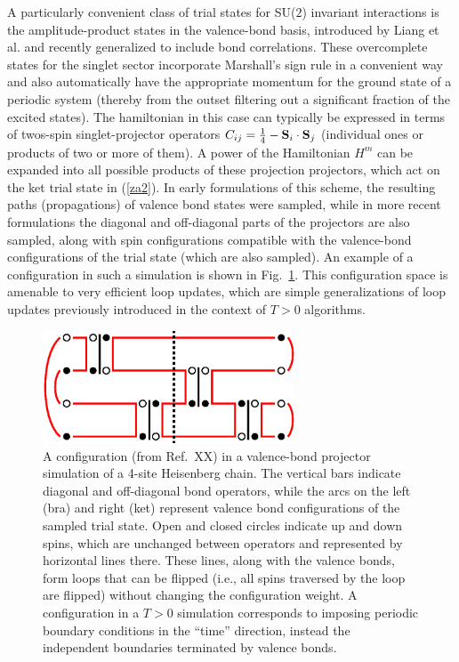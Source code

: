 \documentclass[aps,prb,groupedaddress,twocolumn]{revtex4}
\begin{document}
A particularly convenient class of trial states for SU($2$) invariant interactions is the amplitude-product states in the valence-bond basis, 
introduced by Liang et al. and recently generalized to include bond correlations. These overcomplete states for the singlet sector incorporate
Marshall's sign rule in a convenient way and also automatically have the appropriate momentum for the ground state of a periodic system (thereby
from the outset filtering out a significant fraction of the excited states). The hamiltonian in this case can typically be expressed in terms of 
twos-spin singlet-projector operators $C_{ij}=\frac{1}{4}-{\bf S}_i\cdot {\bf S}_j$ (individual ones or products of two or more of them). A power 
of the Hamiltonian $H^m$ can be expanded into all possible products of these projection projectors, which act on the ket trial state in (\ref{za2}). 
In early formulations of this scheme, the resulting paths (propagations) of valence bond states were sampled, while in more recent formulations the 
diagonal and off-diagonal parts of the projectors are also sampled, along with spin configurations compatible with the valence-bond configurations 
of the trial state (which are also sampled). An example of a configuration in such a simulation is shown in Fig.~\ref{loops}. This configuration
space is amenable to very efficient loop updates, which are simple generalizations of loop updates previously introduced in the context of $T>0$
algorithms. 

\begin{figure}
\includegraphics[width=7.5cm, clip]{loops}
\caption{A configuration (from Ref.~XX) in a valence-bond projector simulation of a 4-site Heisenberg chain. The vertical bars 
indicate diagonal and off-diagonal bond operators, while the arcs on the left (bra) and right (ket) represent valence 
bond configurations of the sampled trial state. Open and closed circles indicate up and down spins, which are unchanged between 
operators and represented by horizontal lines there. These lines, along with the valence bonds, form loops that can be flipped
(i.e., all spins traversed by the loop are flipped) without changing the configuration weight. A configuration in a $T>0$
simulation corresponds to imposing periodic boundary conditions in the ``time'' direction, instead the independent boundaries
terminated by valence bonds.}
\label{loops}
\end{figure}
\end{document}
